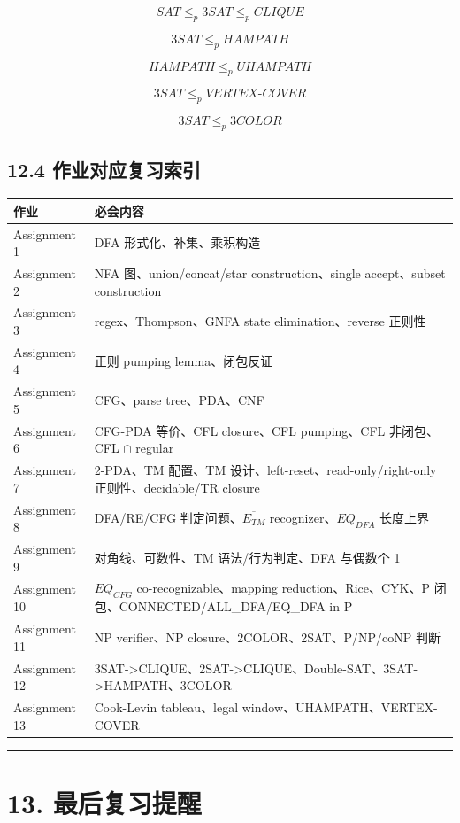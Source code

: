 ﻿\documentclass[UTF8,11pt]{ctexart}
\begin{document}
\[
SAT \le_p 3SAT \le_p CLIQUE
\]

\[
3SAT \le_p HAMPATH
\]

\[
HAMPATH \le_p UHAMPATH
\]

\[
3SAT \le_p VERTEX\text{-}COVER
\]

\[
3SAT \le_p 3COLOR
\]


\subsection{12.4 作业对应复习索引}


\begin{longtable}{|p{}|p{}|}
\hline
\textbf{作业} & \textbf{必会内容} \\
\hline
Assignment 1 & DFA 形式化、补集、乘积构造 \\
\hline
Assignment 2 & NFA 图、union/concat/star construction、single accept、subset construction \\
\hline
Assignment 3 & regex、Thompson、GNFA state elimination、reverse 正则性 \\
\hline
Assignment 4 & 正则 pumping lemma、闭包反证 \\
\hline
Assignment 5 & CFG、parse tree、PDA、CNF \\
\hline
Assignment 6 & CFG-PDA 等价、CFL closure、CFL pumping、CFL 非闭包、CFL $\cap$ regular \\
\hline
Assignment 7 & 2-PDA、TM 配置、TM 设计、left-reset、read-only/right-only 正则性、decidable/TR closure \\
\hline
Assignment 8 & DFA/RE/CFG 判定问题、\(\overline{E_{TM}}\) recognizer、\(EQ_{DFA}\) 长度上界 \\
\hline
Assignment 9 & 对角线、可数性、TM 语法/行为判定、DFA 与偶数个 1 \\
\hline
Assignment 10 & \(EQ_{CFG}\) co-recognizable、mapping reduction、Rice、CYK、P 闭包、CONNECTED/ALL\_DFA/EQ\_DFA in P \\
\hline
Assignment 11 & NP verifier、NP closure、2COLOR、2SAT、P/NP/coNP 判断 \\
\hline
Assignment 12 & 3SAT->CLIQUE、2SAT->CLIQUE、Double-SAT、3SAT->HAMPATH、3COLOR \\
\hline
Assignment 13 & Cook-Levin tableau、legal window、UHAMPATH、VERTEX-COVER \\
\hline
\end{longtable}


\bigskip\hrule\bigskip


\section{13. 最后复习提醒}
\end{document}
